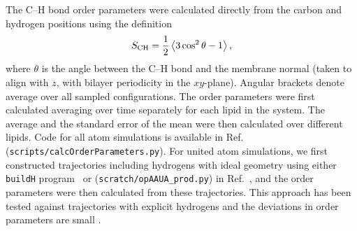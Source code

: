 \documentclass[journal=jpcbfk]{achemso}
\begin{document}
The C--H bond order parameters were calculated directly
from the carbon and hydrogen positions using the definition
\begin{equation}
S_{\rm CH}=\frac{1}{2}\left\langle 3\cos^2\theta -1 \right\rangle,
\end{equation}
where $\theta$ is the angle between the C--H bond and the membrane normal
(taken to align with $z$, with bilayer periodicity in the $xy$-plane).
Angular brackets denote average over all sampled configurations.
The order parameters were first calculated averaging over time separately
for each lipid in the system. The average and
the standard error of the mean were then calculated over different lipids.
Code for all atom simulations is available in Ref.~ (\texttt{scripts/calcOrderParameters.py}).
For united atom simulations, we first constructed trajectories including hydrogens with ideal geometry using either \texttt{buildH} program~\cite{buildH} or (\texttt{scratch/opAAUA\_prod.py}) in  Ref.~, and the order parameters were then calculated from these trajectories. This approach has been tested against trajectories with explicit hydrogens and the deviations in order parameters are small \cite{buildHvalidation,piggot17}.\\
\end{document}
